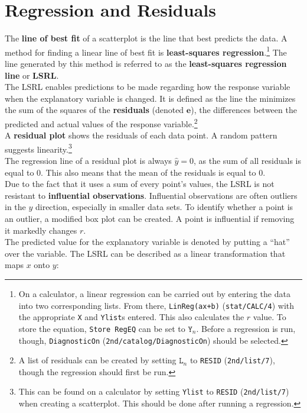 \documentclass[../AP_Statistics.tex]{subfiles}
\begin{document}
		\section{Regression and Residuals}
			The \textbf{line of best fit} of a scatterplot is the line that best predicts the data. A method for finding a linear line of best fit is \textbf{least-squares regression}.\footnote{On a calculator, a linear regression can be carried out by entering the data into two corresponding lists. From there, \texttt{LinReg(ax+b)} (\texttt{stat/CALC/4}) with the appropriate \texttt{X} and \texttt{Ylist}s entered. This also calculates the $r$ value. To store the equation, \texttt{Store RegEQ} can be set to $\texttt{Y}_n$. Before a regression is run, though, \texttt{DiagnosticOn} (\texttt{2nd/catalog/DiagnosticOn}) should be selected.} The line generated by this method is referred to as the \textbf{least-squares regression line} or \textbf{LSRL}. \\
			The LSRL enables predictions to be made regarding how the response variable when the explanatory variable is changed. It is defined as the line the minimizes the sum of the squares of the \textbf{residuals} (denoted $\pmb{e}$), the differences between the predicted and actual values of the response variable.\footnote{A list of residuals can be created by setting $\texttt{L}_n$ to \texttt{RESID} (\texttt{2nd/list/7}), though the regression should first be run.} \\
			A \textbf{residual plot} shows the residuals of each data point. A random pattern suggests linearity.\footnote{This can be found on a calculator by setting \texttt{Ylist} to \texttt{RESID} (\texttt{2nd/list/7}) when creating a scatterplot. This should be done after running a regression.} \\
			The regression line of a residual plot is always $\hat{y} = 0$, as the sum of all residuals is equal to 0. This also means that the mean of the residuals is equal to 0. \\
			Due to the fact that it uses a sum of every point's values, the LSRL is not resistant to \textbf{influential observations}. Influential observations are often outliers in the $y$ direction, especially in smaller data sets. To identify whether a point is an outlier, a modified box plot can be created. A point is influential if removing it markedly changes $r$. \\
			The predicted value for the explanatory variable is denoted by putting a \enquote{hat} over the variable.
			The LSRL can be described as a linear transformation that maps $x$ onto $y$:		
\end{document}
